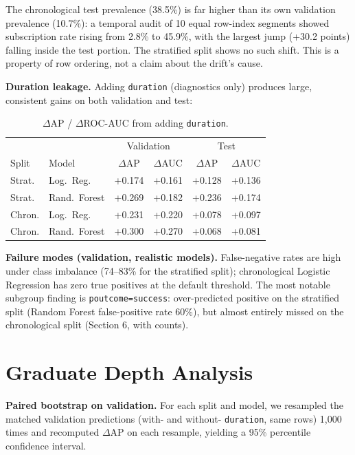 \documentclass{article}
\begin{document}
The chronological test prevalence (38.5\%) is far higher than its own
validation prevalence (10.7\%): a temporal audit of 10 equal row-index
segments showed subscription rate rising from 2.8\% to 45.9\%, with the
largest jump (+30.2 points) falling inside the test portion. The stratified
split shows no such shift. This is a property of row ordering, not a claim
about the drift's cause.

\textbf{Duration leakage.} Adding \texttt{duration} (diagnostics only)
produces large, consistent gains on both validation and test:

\begin{table}[ht]
\centering
\footnotesize
\caption{$\Delta$AP / $\Delta$ROC-AUC from adding \texttt{duration}.}
\begin{tabular}{llcccc}
\toprule
& & \multicolumn{2}{c}{Validation} & \multicolumn{2}{c}{Test} \\
Split & Model & $\Delta$AP & $\Delta$AUC & $\Delta$AP & $\Delta$AUC \\
\midrule
Strat. & Log.\ Reg. & +0.174 & +0.161 & +0.128 & +0.136 \\
Strat. & Rand.\ Forest & +0.269 & +0.182 & +0.236 & +0.174 \\
Chron. & Log.\ Reg. & +0.231 & +0.220 & +0.078 & +0.097 \\
Chron. & Rand.\ Forest & +0.300 & +0.270 & +0.068 & +0.081 \\
\bottomrule
\end{tabular}
\end{table}

\textbf{Failure modes (validation, realistic models).} False-negative rates
are high under class imbalance (74--83\% for the stratified split);
chronological Logistic Regression has zero true positives at the default
threshold. The most notable subgroup finding is \texttt{poutcome=success}:
over-predicted positive on the stratified split (Random Forest
false-positive rate 60\%), but almost entirely missed on the chronological
split (Section 6, with counts).

\section{Graduate Depth Analysis}
\textbf{Paired bootstrap on validation.} For each split and model, we
resampled the matched validation predictions (with- and without-
\texttt{duration}, same rows) 1{,}000 times and recomputed $\Delta$AP on
each resample, yielding a 95\% percentile confidence interval.
\end{document}
